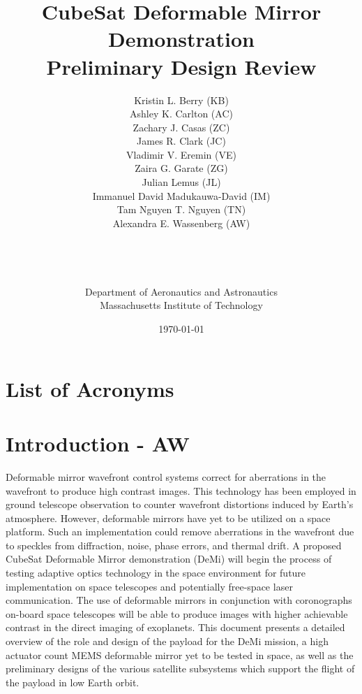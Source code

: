 \documentclass[12pt]{article}
\title{CubeSat Deformable Mirror Demonstration\\Preliminary Design Review\\}
\author{Kristin L. Berry (KB)\\
Ashley K. Carlton (AC)\\
Zachary J. Casas (ZC)\\
James R. Clark (JC)\\
Vladimir V. Eremin (VE)\\ 
Zaira G. Garate (ZG)\\ 
Julian Lemus (JL)\\
Immanuel David Madukauwa-David (IM)\\
Tam Nguyen T. Nguyen (TN)\\
Alexandra E. Wassenberg (AW)\\\\\\\\\\
Department of Aeronautics and Astronautics\\
Massachusetts Institute of Technology\\
}
\date{\today}
\begin{document}
\maketitle
\newpage

\tableofcontents
\listoffigures
\listoftables


\section*{List of Acronyms}
\begin{acronym}


\end{acronym}
\newpage

\section{Introduction - AW}

Deformable mirror wavefront control systems correct for aberrations in the wavefront to produce high contrast images.  This technology has been employed in ground telescope observation to counter wavefront distortions induced by Earth's atmosphere.  However, deformable mirrors have yet to be utilized on a space platform.  Such an implementation could remove aberrations in the wavefront due to speckles from diffraction, noise, phase errors, and thermal drift.  A proposed CubeSat Deformable Mirror demonstration (DeMi) will begin the process of testing adaptive optics technology in the space environment for future implementation on space telescopes and potentially free-space laser communication.  The use of deformable mirrors in conjunction with coronographs on-board space telescopes will be able to produce images with higher achievable contrast in the direct imaging of exoplanets.  This document presents a detailed overview of the role and design of the payload for the DeMi mission, a high actuator count MEMS deformable mirror yet to be tested in space, as well as the preliminary designs of the various satellite subsystems which support the flight of the payload in low Earth orbit.  
\end{document}
